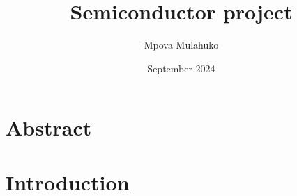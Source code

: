 \documentclass{article}
\title{Semiconductor project}
\author{Mpova Mulahuko }
\date{September 2024}
\begin{document}
\maketitle

\section{Abstract}


\section{Introduction}
\end{document}
